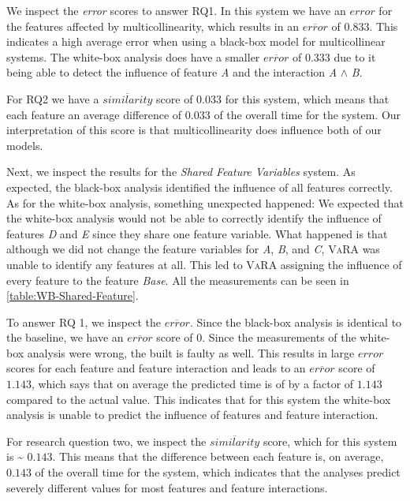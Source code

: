 We inspect the \emph{error} scores to answer RQ1. In this system we have an $error$ for the features affected by multicollinearity,
which results in an $\overline{error}$ of $0.833$. This indicates a high average error when using a black-box model for multicollinear systems.
The white-box analysis does have a smaller $\overline{error}$ of $0.333$ due to it being able to detect the influence of feature \emph{A} and
the interaction \emph{A} $\land$ \emph{B}.

For RQ2 we have a $\overline{similarity}$ score of $0.033$ for this system,
which means that each feature an average difference of $0.033$ of the overall time for the system. 
Our interpretation of this score is that multicollinearity does influence both of our models. 

Next, we inspect the results for the \emph{Shared Feature Variables} system. 
As expected, the black-box analysis identified the influence of all features correctly. 
As for the white-box analysis, something unexpected happened: 
We expected that the white-box analysis would not be able to correctly identify the influence of features \emph{D} and \emph{E} since they share one
feature variable. What happened is that although we did not change the feature variables for \emph{A}, \emph{B}, and \emph{C}, \textsc{VaRA} 
was unable to identify any features at all. This led to \textsc{VaRA} assigning the influence of every feature to the feature \emph{Base}.
All the measurements can be seen in \autoref{table:WB-Shared-Feature}.

To answer RQ 1, we inspect the $\overline{error}$. Since the black-box analysis is identical to the baseline, we have an 
$\overline{error}$ score of $0$. Since the measurements of the white-box analysis were wrong, the {\perfInfluenceModel} built
is faulty as well. This results in large $error$ scores for each feature and feature interaction and leads to an $\overline{error}$ score
of $1.143$, which says that on average the predicted time is of by a factor of $1.143$ compared to the actual value.
This indicates that for this system the white-box analysis is unable to predict the influence of features and feature interaction.

For research question two, we inspect the $\overline{similarity}$ score, which for this system is \textasciitilde{} $0.143$.
This means that the difference between each feature is, on average, $0.143$ of the overall time for the system,
which indicates that the analyses predict severely different values for most features and feature interactions.

